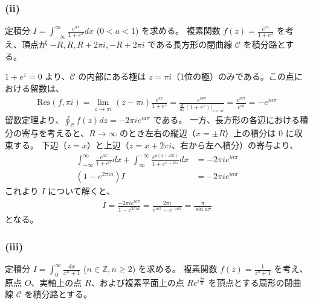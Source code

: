 \documentclass[platex,dvipdfmx,a4paper]{jsarticle}
\begin{document}
  \subsubsection*{(ii)}
  定積分 $I = \int_{-\infty}^{\infty} \frac{e^{ax}}{1+e^x} dx$ ($0<a<1$) を求める。
  複素関数 $f(z) = \frac{e^{az}}{1+e^z}$ を考え、頂点が $-R, R, R+2\pi i, -R+2\pi i$ である長方形の閉曲線 $\mathcal{C}$ を積分路とする。

  $1+e^z = 0$ より、$\mathcal{C}$ の内部にある極は $z = \pi i$（1位の極）のみである。この点における留数は、
  \begin{align*}
  \text{Res}(f, \pi i) = \lim_{z \to \pi i} (z-\pi i) \frac{e^{az}}{1+e^z} = \frac{e^{ia\pi}}{\frac{d}{dz}(1+e^z)\big|_{z=\pi i}} = \frac{e^{ia\pi}}{e^{i\pi}} = -e^{ia\pi}
  \end{align*}
  留数定理より、$\oint_{\mathcal{C}} f(z) dz = -2\pi i e^{ia\pi}$ である。
  一方、長方形の各辺における積分の寄与を考えると、$R \to \infty$ のとき左右の縦辺（$x = \pm R$）上の積分は $0$ に収束する。
  下辺（$z=x$）と上辺（$z=x+2\pi i$、右から左へ積分）の寄与より、
  \begin{align*}
  \int_{-\infty}^{\infty} \frac{e^{ax}}{1+e^x} dx + \int_{\infty}^{-\infty} \frac{e^{a(x+2\pi i)}}{1+e^{x+2\pi i}} dx &= -2\pi i e^{ia\pi} \\
  (1 - e^{2\pi i a}) I &= -2\pi i e^{ia\pi}
  \end{align*}
  これより $I$ について解くと、
  \begin{align*}
  I = \frac{-2\pi i e^{ia\pi}}{1 - e^{2\pi i a}} = \frac{2\pi i}{e^{ia\pi} - e^{-ia\pi}} = \frac{\pi}{\sin a\pi}
  \end{align*}
  となる。

  \subsubsection*{(iii)}
  定積分 $I = \int_{0}^{\infty} \frac{dx}{x^n+1}$ ($n \in \mathbb{Z}, n \ge 2$) を求める。
  複素関数 $f(z) = \frac{1}{z^n+1}$ を考え、原点 $O$、実軸上の点 $R$、および複素平面上の点 $R e^{i\frac{2\pi}{n}}$ を頂点とする扇形の閉曲線 $\mathcal{C}$ を積分路とする。
\end{document}
